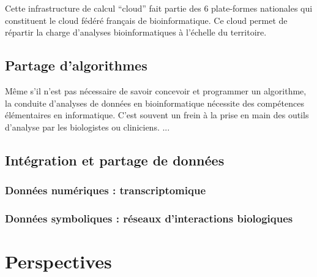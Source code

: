 \documentclass[a4paper,11pt]{article}
\theoremstyle{definition}
\begin{document}
Cette infrastructure de calcul ``cloud'' fait partie des 6 plate-formes nationales qui constituent le cloud fédéré français de bioinformatique. Ce cloud permet de répartir la charge d'analyses bioinformatiques à l'échelle du territoire. 

\subsection{Partage d'algorithmes}
Même s'il n'est pas nécessaire de savoir concevoir et programmer un algorithme, la conduite d'analyses de données en bioinformatique nécessite des compétences élémentaires en informatique. C'est souvent un frein à la prise en main des outils d'analyse par les biologistes ou cliniciens. ...

\subsection{Intégration et partage de données}
\subsubsection{Données numériques : transcriptomique}
\subsubsection{Données symboliques : réseaux d'interactions biologiques}

\section{Perspectives}
\end{document}
